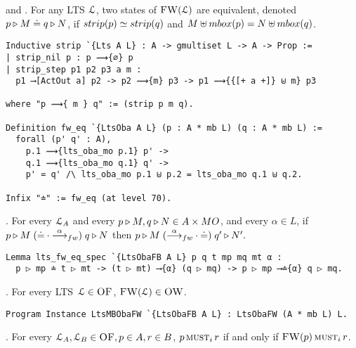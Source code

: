  and .
For any LTS $\mathcal{L}$,
two states of $\textsc{FW}(\mathcal{L})$ are equivalent, denoted
$p \triangleright M \doteq q \triangleright N$, if
$ \strip{ \serverA } \simeq \strip{ \serverB }$
and $M \uplus \outputmultiset{\serverA} = N \uplus \outputmultiset{\serverB}$.

\begin{mdframed}
\begin{verbatim}
Inductive strip `{Lts A L} : A -> gmultiset L -> A -> Prop :=
| strip_nil p : p ⟿{∅} p
| strip_step p1 p2 p3 a m :
  p1 ⟶[ActOut a] p2 -> p2 ⟿{m} p3 -> p1 ⟿{{[+ a +]} ⊎ m} p3

where "p ⟿{ m } q" := (strip p m q).

Definition fw_eq `{LtsOba A L} (p : A * mb L) (q : A * mb L) :=
  forall (p' q' : A),
    p.1 ⟿{lts_oba_mo p.1} p' ->
    q.1 ⟿{lts_oba_mo q.1} q' ->
    p' ⋍ q' /\ lts_oba_mo p.1 ⊎ p.2 = lts_oba_mo q.1 ⊎ q.2.

Infix "≐" := fw_eq (at level 70).
\end{verbatim}
\end{mdframed}

.
For every $\mathcal{L}_A$ and every
$p \triangleright M, q \triangleright N \in A \times MO$,
and every $\alpha \in L$, if
$
\serverA \triangleright M \mathrel{({\doteq} \cdot {\sta{\alpha}})}
\serverB \triangleright N
$ then
$
\serverA  \triangleright M \mathrel{({\sta{\alpha}} \cdot {\doteq})} \serverB' \triangleright N'.
$

\begin{mdframed}
\begin{verbatim}
Lemma lts_fw_eq_spec `{LtsObaFB A L} p q t mp mq mt α :
  p ▷ mp ≐ t ▷ mt -> (t ▷ mt) ⟶{α} (q ▷ mq) -> p ▷ mp ⟶≐{α} q ▷ mq.
\end{verbatim}
\end{mdframed}

. For every LTS~$\mathcal{L} \in \textsc{OF}$, $\textsc{FW}(\mathcal{L}) \in \textsc{OW}$.

\begin{mdframed}
\begin{verbatim}
Program Instance LtsMBObaFW `{LtsObaFB A L} : LtsObaFW (A * mb L) L.
\end{verbatim}
\end{mdframed}


.
For every $\mathcal{L}_A, \mathcal{L}_B \in \textsc{OF}, p \in A, r \in B$,
$p \operatorname{\textsc{must}}_i r$ if and only if $\textsc{FW}(p) \operatorname{\textsc{must}}_i r$.

